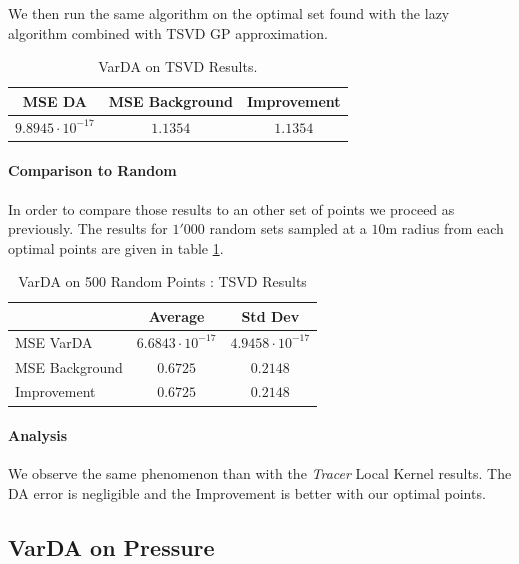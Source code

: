 We then run the same algorithm on the optimal set found with the lazy algorithm combined with TSVD GP approximation. 

\begin{table}[h]
\centering
	\begin{tabular}{c|c|c}
	\toprule
		  MSE DA & MSE Background & Improvement \\ \midrule
		$9.8945 \cdot 10^{-17}$  &  $1.1354$ & $1.1354$ \\ \bottomrule
	\end{tabular}
	\caption{VarDA on TSVD Results. }
\end{table}

\paragraph{Comparison to Random}

In order to compare those results to an other set of points we proceed as previously. The results for $1'000$ random sets sampled at a $10$m radius from each optimal points are given in table 	\ref{tab:TSVD:random}. 
 \\


\begin{table}[h]
\centering
\begin{tabular}{l|cc}
\toprule
               & Average & Std Dev \\ \midrule
MSE VarDA      & $6.6843 \cdot 10^{-17}$  & $4.9458 \cdot 10^{-17}$  \\
MSE Background & $0.6725$  & $0.2148$  \\
Improvement    & $0.6725$  & $0.2148$ \\ \bottomrule
\end{tabular}
	\caption{VarDA on 500 Random Points : TSVD Results}
	\label{tab:TSVD:random}
\end{table}

\paragraph{Analysis}

We observe the same phenomenon than with the \textit{Tracer} Local Kernel results. The DA error is negligible and the Improvement is better with our optimal points. 

\subsection{VarDA on Pressure}

